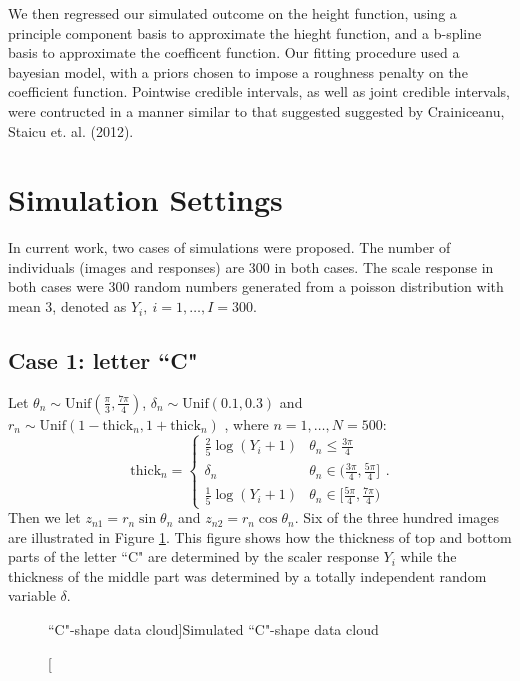 \documentclass[12pt]{article}
\begin{document}
We then regressed our simulated outcome on the height function, using a principle component basis to approximate the hieght function, and a b-spline basis to approximate the coefficent function. Our fitting procedure used a bayesian model, with a priors chosen to impose a roughness penalty on the coefficient function.\cite{goldsmith2010penalized}
\cite{crainiceanu2010bayesian}
\cite{lang2004bayesian}
\cite{Brezger:Kneib:Lang:2005:BaysX}
 Pointwise credible intervals, as well as joint credible intervals, were contructed in a manner similar to that suggested suggested by Crainiceanu, Staicu et. al. (2012).\cite{crainiceanu2012bootstrap}



\section{Simulation Settings}
In current work, two cases of simulations were proposed. The number of individuals (images and responses) are 300 in both cases. The scale response in both cases were 300 random numbers generated from a poisson distribution with mean 3, denoted as $Y_i,\ i=1,\dots,I=300$.
\subsection{Case 1: letter ``C"}
Let $\theta_{n}\sim \text{Unif}(\frac{\pi}{3},\frac{7\pi}{4})$, $\delta_n\sim \text{Unif}(0.1,0.3)$ and $r_{n}\sim \text{Unif}(1-\text{thick}_n, 1+\text{thick}_n)$ , where $n=1,\dots,N=500$:
\begin{equation*}
\text{thick}_n=\left\{\begin{array}{ll}\frac{2}{5}\log(Y_i+1)& \theta_n\le \frac{3\pi}{4}\\ \delta_n & \theta_n\in (\frac{3\pi}{4},\frac{5\pi}{4}]\\\frac{1}{5}\log(Y_i+1)&\theta_n\in [\frac{5\pi}{4},\frac{7\pi}{4})\end{array}\right..
\end{equation*}
Then we let $z_{n1}=r_n\sin\theta_n$ and $z_{n2}=r_n\cos\theta_n$. Six of the three hundred images are illustrated in Figure \ref{fig.Cshape}. This figure shows how the thickness of top and bottom parts of the letter ``C" are determined by the scaler response $Y_i$ while the thickness of the middle part was determined by a totally independent random variable $\delta$. \

\begin{figure}[H]
\caption[``C"-shape data cloud]{\footnotesize Simulated ``C"-shape data cloud}
\label{fig.Cshape}
\begin{minipage}[b]{1\linewidth}
\centering
{}
\end{minipage}
\end{figure}\
\end{document}
